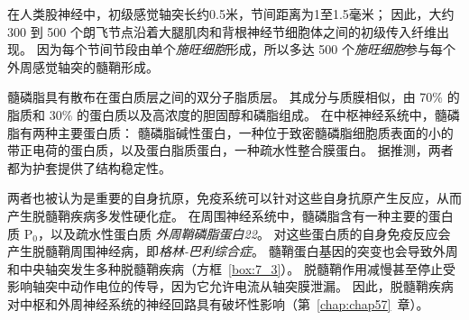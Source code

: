 在人类股神经中，初级感觉轴突长约0.5米，节间距离为1至1.5毫米；
因此，大约 300 到 500 个朗飞节点沿着大腿肌肉和背根神经节细胞体之间的初级传入纤维出现。
因为每个节间节段由单个\textit{施旺细胞}形成，所以多达 500 个\textit{施旺细胞}参与每个外周感觉轴突的髓鞘形成。


髓磷脂具有散布在蛋白质层之间的双分子脂质层。
其成分与质膜相似，由 70\% 的脂质和 30\% 的蛋白质以及高浓度的胆固醇和磷脂组成。
在中枢神经系统中，髓磷脂有两种主要蛋白质：
髓磷脂碱性蛋白，一种位于致密髓磷脂细胞质表面的小的带正电荷的蛋白质，以及蛋白脂质蛋白，一种疏水性整合膜蛋白。
据推测，两者都为护套提供了结构稳定性。



两者也被认为是重要的自身抗原，免疫系统可以针对这些自身抗原产生反应，从而产生脱髓鞘疾病多发性硬化症。 
在周围神经系统中，髓磷脂含有一种主要的蛋白质 P$_0$，以及疏水性蛋白质 \textit{外周鞘磷脂蛋白22}。
对这些蛋白质的自身免疫反应会产生脱髓鞘周围神经病，即\textit{格林-巴利综合症}。
髓鞘蛋白基因的突变也会导致外周和中央轴突发生多种脱髓鞘疾病（方框~\ref{box:7_3}）。
脱髓鞘作用减慢甚至停止受影响轴突中动作电位的传导，因为它允许电流从轴突膜泄漏。
因此，脱髓鞘疾病对中枢和外周神经系统的神经回路具有破坏性影响（第~\ref{chap:chap57}~章）。


